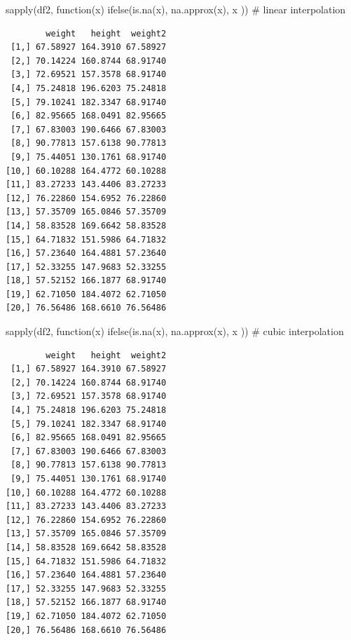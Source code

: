 \documentclass[
  letterpaper,
  DIV=11,
  numbers=noendperiod]{scrreprt}
\newenvironment{Shaded}{\begin{snugshade}}{\end{snugshade}}
\newcommand{\CommentTok}[1]{\textcolor[rgb]{0.37,0.37,0.37}{#1}}
\newcommand{\ControlFlowTok}[1]{\textcolor[rgb]{0.00,0.23,0.31}{#1}}
\newcommand{\FunctionTok}[1]{\textcolor[rgb]{0.28,0.35,0.67}{#1}}
\newcommand{\NormalTok}[1]{\textcolor[rgb]{0.00,0.23,0.31}{#1}}
\begin{document}
\begin{Shaded}
\begin{Highlighting}[]
\FunctionTok{sapply}\NormalTok{(df2, }\ControlFlowTok{function}\NormalTok{(x) }\FunctionTok{ifelse}\NormalTok{(}\FunctionTok{is.na}\NormalTok{(x), }\FunctionTok{na.approx}\NormalTok{(x), x )) }\CommentTok{\# linear interpolation}
\end{Highlighting}
\end{Shaded}

\begin{verbatim}
        weight   height  weight2
 [1,] 67.58927 164.3910 67.58927
 [2,] 70.14224 160.8744 68.91740
 [3,] 72.69521 157.3578 68.91740
 [4,] 75.24818 196.6203 75.24818
 [5,] 79.10241 182.3347 68.91740
 [6,] 82.95665 168.0491 82.95665
 [7,] 67.83003 190.6466 67.83003
 [8,] 90.77813 157.6138 90.77813
 [9,] 75.44051 130.1761 68.91740
[10,] 60.10288 164.4772 60.10288
[11,] 83.27233 143.4406 83.27233
[12,] 76.22860 154.6952 76.22860
[13,] 57.35709 165.0846 57.35709
[14,] 58.83528 169.6642 58.83528
[15,] 64.71832 151.5986 64.71832
[16,] 57.23640 164.4881 57.23640
[17,] 52.33255 147.9683 52.33255
[18,] 57.52152 166.1877 68.91740
[19,] 62.71050 184.4072 62.71050
[20,] 76.56486 168.6610 76.56486
\end{verbatim}

\begin{Shaded}
\begin{Highlighting}[]
\FunctionTok{sapply}\NormalTok{(df2, }\ControlFlowTok{function}\NormalTok{(x) }\FunctionTok{ifelse}\NormalTok{(}\FunctionTok{is.na}\NormalTok{(x), }\FunctionTok{na.approx}\NormalTok{(x), x )) }\CommentTok{\# cubic interpolation}
\end{Highlighting}
\end{Shaded}

\begin{verbatim}
        weight   height  weight2
 [1,] 67.58927 164.3910 67.58927
 [2,] 70.14224 160.8744 68.91740
 [3,] 72.69521 157.3578 68.91740
 [4,] 75.24818 196.6203 75.24818
 [5,] 79.10241 182.3347 68.91740
 [6,] 82.95665 168.0491 82.95665
 [7,] 67.83003 190.6466 67.83003
 [8,] 90.77813 157.6138 90.77813
 [9,] 75.44051 130.1761 68.91740
[10,] 60.10288 164.4772 60.10288
[11,] 83.27233 143.4406 83.27233
[12,] 76.22860 154.6952 76.22860
[13,] 57.35709 165.0846 57.35709
[14,] 58.83528 169.6642 58.83528
[15,] 64.71832 151.5986 64.71832
[16,] 57.23640 164.4881 57.23640
[17,] 52.33255 147.9683 52.33255
[18,] 57.52152 166.1877 68.91740
[19,] 62.71050 184.4072 62.71050
[20,] 76.56486 168.6610 76.56486
\end{verbatim}
\end{document}
